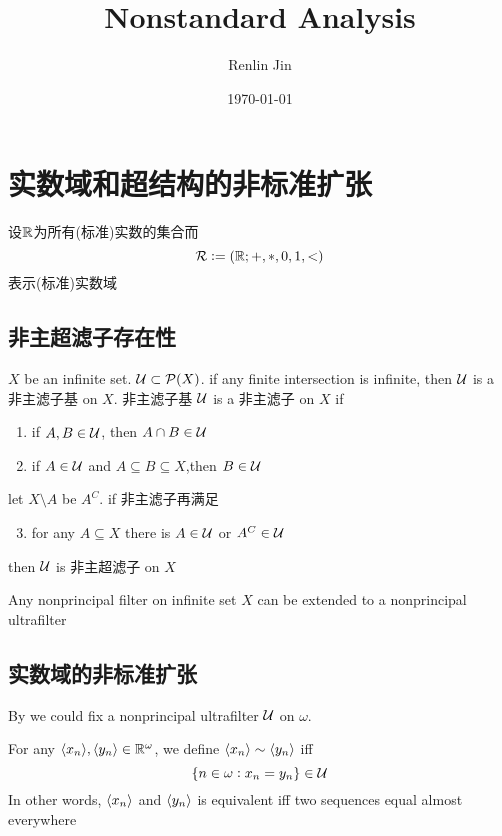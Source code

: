\documentclass[11pt]{article}
\author{Renlin Jin}
\date{\today}
\title{Nonstandard Analysis}
\begin{document}
\maketitle
\tableofcontents \clearpage
\section{实数域和超结构的非标准扩张}
\label{sec:orgd7a642b}
设\(\mathbb{R}\)为所有(标准)实数的集合而
\begin{equation*}
\mathcal{R}:=(\mathbb{R};+,*,0,1,<)
\end{equation*}
表示(标准)实数域
\subsection{非主超滤子存在性}
\label{sec:org356a8a9}
\begin{definition}[]
\(X\) be an infinite set. \(\mathcal{U}\subset\mathcal{P}(X)\). if any finite
intersection is infinite, then \(\mathcal{U}\) is a 非主滤子基 on \(X\). 非主滤子基
\(\mathcal{U}\) is a 非主滤子 on \(X\) if
\begin{enumerate}
\item if \(A,B\in\mathcal{U}\), then \(A\cap B\in\mathcal{U}\)
\item if \(A\in\mathcal{U}\) and \(A\subseteq B\subseteq X\),then \(B\in\mathcal{U}\)
\end{enumerate}


let \(X\setminus A\) be \(A^C\). if 非主滤子再满足
\begin{enumerate}
\setcounter{enumi}{2}
\item for any \(A\subseteq X\) there is \(A\in\mathcal{U}\) or \(A^C\in\mathcal{U}\)
\end{enumerate}


then \(\mathcal{U}\) is 非主超滤子 on \(X\)
\end{definition}

\begin{proposition}
\label{prop1.2}
Any nonprincipal filter on infinite set \(X\) can be extended to a
nonprincipal ultrafilter
\end{proposition}
\subsection{实数域的非标准扩张}
\label{sec:orgbf6741b}
By \label{prop1.2} we could fix a nonprincipal ultrafilter \(\mathcal{U}\) on \(\omega\).
\begin{definition}[]
For any \(\langle x_n\rangle,\langle y_n\rangle\in\mathbb{R}^\omega\), we define \(\langle x_n\rangle\sim\langle
   y_n\rangle\) iff
\begin{equation*}
\{n\in\omega:x_n=y_n\}\in\mathcal{U}
\end{equation*}
In other words, \(\langle x_n\rangle\) and \(\langle y_n\rangle\) is equivalent iff two
sequences equal almost everywhere
\end{definition}
\end{document}
